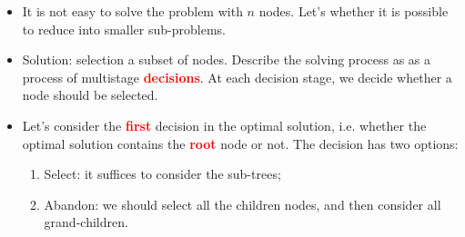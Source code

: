 \documentclass[mathserif]{beamer}
\begin{document}
{	\begin{itemize}
		\item It is not easy to solve the problem with $n$ nodes. Let's whether it is possible to reduce into smaller sub-problems. 
		\item Solution: selection a subset of nodes. Describe the solving process as as  a process of multistage \textcolor{red}{\bf decisions}. At each decision stage, we decide whether a node should be selected. 
		\item Let's consider the \textcolor{red}{\bf first} decision in the optimal solution, i.e.  whether the optimal solution contains the \textcolor{red}{\bf root} node or not. The decision has two options: 
		\begin{enumerate}
		\item {\sc Select}:  it suffices to consider the sub-trees; 
		\item {\sc Abandon}: we should select all the children nodes, and then consider all grand-children. 
		\end{enumerate}
	\end{itemize}

 

} 
\end{document}
